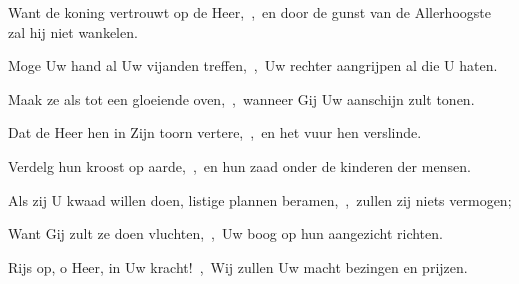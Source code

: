\documentclass[12pt,twoside,a5paper]{article}
\begin{document}
\begin{halfparskip}
  Want de koning vertrouwt op de Heer,~\sep\ en door de gunst van de Allerhoogste zal hij niet wankelen.

  Moge Uw hand al Uw vijanden treffen,~\sep\ Uw rechter aangrijpen al die U haten.

  Maak ze als tot een gloeiende oven,~\sep\ wanneer Gij Uw aanschijn zult tonen.

  Dat de Heer hen in Zijn toorn vertere,~\sep\ en het vuur hen verslinde.

  Verdelg hun kroost op aarde,~\sep\ en hun zaad onder de kinderen der mensen.

  Als zij U kwaad willen doen, listige plannen beramen,~\sep\ zullen zij niets vermogen;

  Want Gij zult ze doen vluchten,~\sep\ Uw boog op hun aangezicht richten.

  Rijs op, o Heer, in Uw kracht!~\sep\ Wij zullen Uw macht bezingen en prijzen.
\end{halfparskip}
\end{document}

